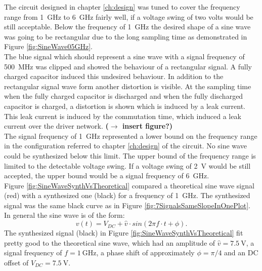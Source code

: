 The circuit designed in chapter \ref{ch:design} was tuned to cover the frequency range from \SI{1}{\GHz} to \SI{6}{\GHz} fairly well, if a voltage swing of two volts would be still acceptable.
Below the frequency of \SI{1}{\GHz} the desired shape of a sine wave was going to be rectangular due to the long sampling time as demonstrated in Figure \ref{fig:SineWave05GHz}.\\
The blue signal which should represent a sine wave with a signal frequency of \SI{500}{\MHz} was clipped and showed the behaviour of a rectangular signal.
 A fully charged capacitor induced this undesired behaviour.
In addition to the rectangular signal wave form another distortion is visible.
At the sampling time when the fully charged capacitor is discharged and when the fully discharged capacitor is charged, a distortion is shown which is induced by a leak current.
This leak current is induced by the commutation time, which induced a leak current over the driver network. \textbf{($\rightarrow$ insert figure?)}\\
 The signal frequency of \SI{1}{\giga \hertz} represented a lower bound on the frequency range in the configuration referred to chapter \ref{ch:design} of the circuit.
No sine wave could be synthesized below this limit.
The upper bound of the frequency range is limited to the detectable voltage swing.
If a voltage swing of \SI{2}{\volt} would be still accepted, the upper bound would be a signal frequency of \SI{6}{\GHz}.\\
Figure \ref{fig:SineWaveSynthVsTheoretical} compared a theoretical sine wave signal (red) with a synthesized one (black) for a frequency of \SI{1}{\GHz}.
The synthesized signal was the same black curve as in Figure \ref{fig:7SignalsSameSlopeInOnePlot}.
In general the sine wave is of the form: 
\begin{equation}
	v(t)= V_{DC} + \widehat{v} \cdot sin( 2  \pi  f \cdot  t + \phi).
\end{equation}
The synthesized signal (black) in Figure \ref{fig:SineWaveSynthVsTheoretical} fit pretty good to the theoretical sine wave, which had an amplitude of $\widehat{v} = \SI{7.5}{\volt}$, a signal frequency of $f = \SI{1}{\giga \hertz}$, a phase shift of approximately $\phi = \pi / 4$ and an DC offset of $V_{DC} = \SI{7.5}{\volt}$.

